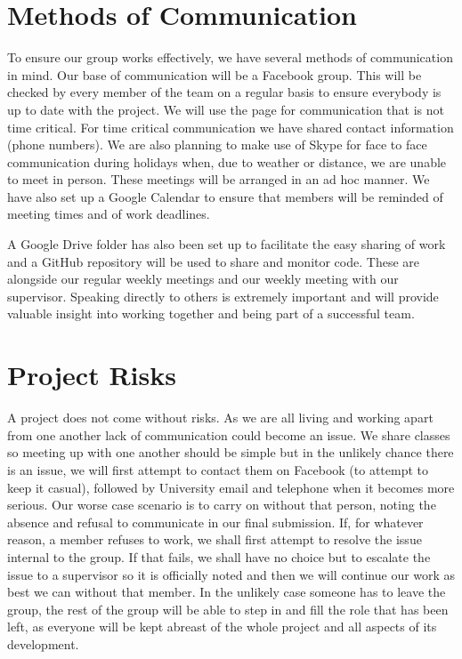 \documentclass[11pt]{article}
\begin{document}
\section{Methods of Communication}
To ensure our group works effectively, we have several methods of 
communication in mind. Our base of communication will be a Facebook 
group. This will be checked by every member of the team on a regular 
basis to ensure everybody is up to date with the project. We will use 
the page for communication that is not time critical. For time 
critical communication we have shared contact information (phone 
numbers). We are also planning to make use of Skype for face to face 
communication during holidays when, due to weather or distance, we 
are unable to meet in person. These meetings will be arranged in an 
ad hoc manner. We have also set up a Google Calendar to ensure that 
members will be reminded of meeting times and of work deadlines. 

A Google Drive folder has also been set up to facilitate the easy 
sharing of work and a GitHub repository will be used to share and 
monitor code. These are alongside our regular weekly meetings and our 
weekly meeting with our supervisor. Speaking directly to others is 
extremely important and will provide valuable insight into working 
together and being part of a successful team.


\section{Project Risks}

A project does not come without risks. As we are all living and 
working apart from one another lack of communication could become 
an issue. We share classes so meeting up with one another should be 
simple but in the unlikely chance there is an issue, we will first 
attempt to contact them on Facebook (to attempt to keep it casual), 
followed by University email and telephone when it becomes more 
serious. Our worse case scenario is to carry on without that person, 
noting the absence and refusal to communicate in our final submission. 
If, for whatever reason, a member refuses to work, we shall first 
attempt to resolve the issue internal to the group. If that fails, 
we shall have no choice but to escalate the issue to a supervisor so 
it is officially noted and then we will continue our work as best we 
can without that member. In the unlikely case someone has to leave the 
group, the rest of the group will be able to step in and fill the 
role that has been left, as everyone will be kept abreast of the whole 
project and all aspects of its development.
\end{document}
